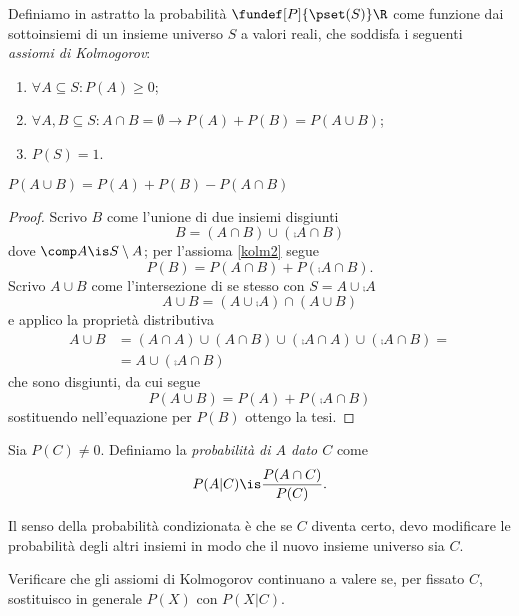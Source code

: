 
\begin{definition}[Probabilità]
	Definiamo in astratto la probabilità $\fundef[P]{\pset(S)}\R$ come funzione dai sottoinsiemi di un insieme universo $S$ a valori reali, che soddisfa i seguenti \emph{assiomi di Kolmogorov}:
	\begin{enumerate}
		\item $\forall A\subseteq S:P(A) \ge 0$;
		\item $\forall A,B\subseteq S: A\cap B=\emptyset \rightarrow P(A)+P(B)=P(A\cup B)$; \label{kolm2}
		\item $P(S)=1$.
	\end{enumerate}
\end{definition}

\begin{theorem}
	$P(A\cup B) = P(A) + P(B) - P(A\cap B)$
\end{theorem}

\begin{proof}
	Scrivo $B$ come l'unione di due insiemi disgiunti
	\[B = (A\cap B) \cup (\comp A \cap B)\]
	dove $\comp A\is S\setminus A$; per l'assioma \ref{kolm2} segue
	\[P(B) = P(A\cap B) + P(\comp A \cap B).\]
	Scrivo $A\cup B$ come l'intersezione di se stesso con $S=A\cup\comp A$
	\[A\cup B = (A\cup\comp A) \cap (A\cup B)\]
	e applico la proprietà distributiva
	\begin{align*}
		A\cup B
		&= (A\cap A) \cup (A\cap B) \cup (\comp A\cap A) \cup (\comp A \cap B) = \\
		&= A \cup (\comp A\cap B)
	\end{align*}
	che sono disgiunti, da cui segue
	\[P(A\cup B) =  P(A) + P(\comp A\cap B)\]
	sostituendo nell'equazione per $P(B)$ ottengo la tesi.
\end{proof}

\begin{definition}
	Sia $P(C)\neq 0$. Definiamo la \emph{probabilità di $A$ dato $C$} come
	\[P(A|C) \is \frac{P(A\cap C)}{P(C)}.\]
\end{definition}

Il senso della probabilità condizionata è che se $C$ diventa certo, devo modificare le probabilità degli altri insiemi in modo che il nuovo insieme universo sia $C$.

\begin{exercise}
	Verificare che gli assiomi di Kolmogorov continuano a valere se, per fissato $C$, sostituisco in generale $P(X)$ con $P(X|C)$.
\end{exercise}

